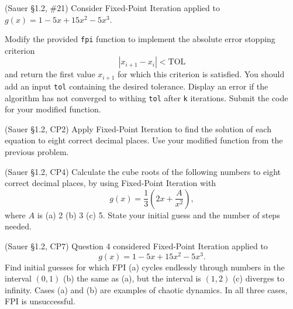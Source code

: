 \documentclass[12pt,fleqn]{exam}
\begin{document}
\begin{questions}

\question (Sauer \S1.2, \#21) Consider Fixed-Point Iteration applied to $g(x) = 1 - 5x + 15 x^2 - 5 x^3$.


\question Modify the provided \verb$fpi$ function to implement the absolute error stopping criterion
\[|x_{i+1}-x_i| < \mathrm{TOL}\]
and return the first value $x_{i+1}$ for which this criterion is satisfied. You should add an input \verb$tol$ containing the desired tolerance. Display an error if the algorithm has not converged to withing \verb$tol$ after \verb$k$ iterations. Submit the code for your modified function.

\question (Sauer \S1.2, CP2) Apply Fixed-Point Iteration to find the solution of each equation to eight correct decimal places. Use your modified function from the previous problem.


\newpage

\question (Sauer \S1.2, CP4) Calculate the cube roots of the following numbers to eight correct decimal places, by using Fixed-Point Iteration with 
\[g(x) = \frac13\left(2x + \frac{A}{x^2}\right),\]
where $A$ is (a) 2 (b) 3 (c) 5. State your initial guess and the number of steps needed.

\question (Sauer \S1.2, CP7) Question 4 considered Fixed-Point Iteration applied to
\[g(x) = 1 - 5x + 15 x^2 - 5 x^3.\]
Find initial guesses for which FPI (a) cycles endlessly through numbers in the interval $(0,1)$ (b) the same as (a), but the interval is $(1,2)$ (c) diverges to infinity. Cases (a) and (b) are examples of chaotic dynamics. In all three cases, FPI is unsuccessful.

\end{questions}
\end{document}
